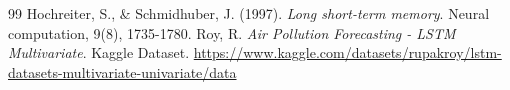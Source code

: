 \documentclass[12pt,a4paper]{article}
\begin{document}
\newpage
{}
{}
\begin{thebibliography}{99}
     Hochreiter, S., \& Schmidhuber, J. (1997). \textit{Long short-term memory}. Neural computation, 9(8), 1735-1780.
     Roy, R. \textit{Air Pollution Forecasting - LSTM Multivariate}. Kaggle Dataset. \url{https://www.kaggle.com/datasets/rupakroy/lstm-datasets-multivariate-univariate/data}
\end{thebibliography}
\end{document}
